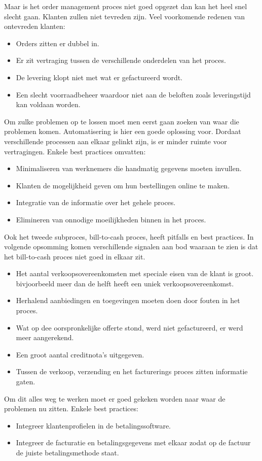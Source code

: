 Maar is het order management proces niet goed opgezet dan kan het heel snel slecht gaan. Klanten zullen niet tevreden zijn. 
Veel voorkomende redenen van ontevreden klanten:
\begin{itemize}
	\item Orders zitten er dubbel in.
	\item Er zit vertraging tussen de verschillende onderdelen van het proces.
	\item De levering klopt niet met wat er gefactureerd wordt.
	\item Een slecht voorraadbeheer waardoor niet aan de beloften zoals leveringstijd kan voldaan worden.
\end{itemize}
Om zulke problemen op te lossen moet men eerst gaan zoeken van waar die problemen komen. Automatisering is hier een goede oplossing voor. Dordaat verschillende processen aan elkaar gelinkt zijn, is er minder ruimte voor vertragingen. Enkele best practices omvatten:
\begin{itemize}
	\item Minimaliseren van werknemers die handmatig gegevens moeten invullen.
	\item Klanten de mogelijkheid geven om hun bestellingen online te maken.
	\item Integratie van de informatie over het gehele proces.
	\item Elimineren van onnodige moeilijkheden binnen in het proces.
\end{itemize}

Ook het tweede subproces, bill-to-cash proces, heeft pitfalls en best practices.
In volgende opsomming komen verschillende signalen aan bod waaraan te zien is dat het bill-to-cash proces niet goed in elkaar zit.
\begin{itemize}
	\item Het aantal verkoopsovereenkomsten met speciale eisen van de klant is groot. bivjoorbeeld meer dan de helft heeft een uniek verkoopsovereenkomst.
	\item Herhalend aanbiedingen en toegevingen moeten doen door fouten in het proces.
	\item Wat op dee oorspronkelijke offerte stond, werd niet gefactureerd, er werd meer aangerekend.
	\item Een groot aantal creditnota's uitgegeven.
	\item Tussen de verkoop, verzending en het facturerings proces zitten informatie gaten.
\end{itemize}
Om dit alles weg te werken moet er goed gekeken worden naar waar de problemen nu zitten. Enkele best practices:
\begin{itemize}
	\item Integreer klantenprofielen in de betalingssoftware.
	\item Integreer de facturatie en betalingsgegevens met elkaar zodat op de factuur de juiste betalingsmethode staat.
\end{itemize}


